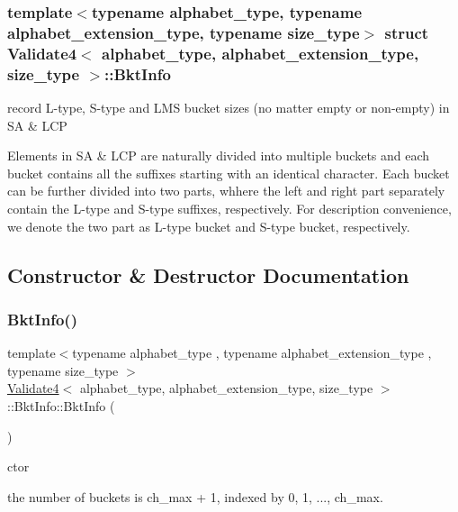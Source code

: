 \subsubsection*{template$<$typename alphabet\+\_\+type, typename alphabet\+\_\+extension\+\_\+type, typename size\+\_\+type$>$\newline
struct Validate4$<$ alphabet\+\_\+type, alphabet\+\_\+extension\+\_\+type, size\+\_\+type $>$\+::\+Bkt\+Info}

record L-\/type, S-\/type and L\+MS bucket sizes (no matter empty or non-\/empty) in SA \& L\+CP 

Elements in SA \& L\+CP are naturally divided into multiple buckets and each bucket contains all the suffixes starting with an identical character. Each bucket can be further divided into two parts, whhere the left and right part separately contain the L-\/type and S-\/type suffixes, respectively. For description convenience, we denote the two part as L-\/type bucket and S-\/type bucket, respectively. 

\subsection{Constructor \& Destructor Documentation}
\mbox{\label{struct_validate4_1_1_bkt_info_ac9e39b62bee276f6a9604bff588b6ecc}} 
\subsubsection{\texorpdfstring{Bkt\+Info()}{BktInfo()}}
{\footnotesize\ttfamily template$<$typename alphabet\+\_\+type , typename alphabet\+\_\+extension\+\_\+type , typename size\+\_\+type $>$ \\
\hyperlink{class_validate4}{Validate4}$<$ alphabet\+\_\+type, alphabet\+\_\+extension\+\_\+type, size\+\_\+type $>$\+::Bkt\+Info\+::\+Bkt\+Info (\begin{DoxyParamCaption}{ }\end{DoxyParamCaption})\hspace{0.3cm}{\ttfamily [inline]}}



ctor 

the number of buckets is ch\+\_\+max + 1, indexed by 0, 1, ..., ch\+\_\+max. 

